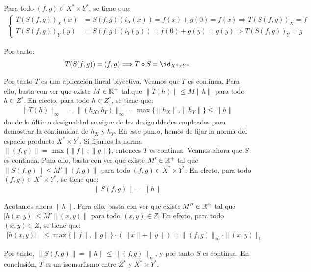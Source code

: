 \begin{ejercicio}
Para todo $(f, g) \in X^* \times Y^*$, se tiene que:
\begin{align*}
    \begin{cases}
        T(S(f, g))_X(x) &= S(f, g)(i_X(x)) = f(x) + g(0) = f(x) \Longrightarrow T(S(f, g))_X = f\\
        T(S(f, g))_Y(y) &= S(f, g)(i_Y(y)) = f(0) + g(y) = g(y) \Longrightarrow T(S(f, g))_Y = g
    \end{cases}
\end{align*}

Por tanto:
$$T(S(f, g)) = (f, g) \Longrightarrow T \circ S = \id_{X^* \times Y^*}$$

Por tanto $T$ es una aplicación lineal biyectiva. Veamos que $T$ es continua. Para ello, basta con ver que existe $M \in \mathbb{R}^+$ tal que $\|T(h)\| \leq M \|h\|$ para todo $h \in Z^*$. En efecto, para todo $h \in Z^*$, se tiene que:
\begin{align*}
    \|T(h)\|_\infty &= \|(h_X, h_Y)\|_\infty = \max\{\|h_X\|, \|h_Y\|\} \leq \|h\|
\end{align*}
donde la última desigualdad se sigue de las desigualdades empleadas para demostrar la continuidad de $h_X$ y $h_Y$. En este punto, hemos de fijar la norma del espacio producto $X^* \times Y^*$. Si fijamos la norma $\|(f, g)\| = \max\{\|f\|, \|g\|\}$, entonces $T$ es continua. Veamos ahora que $S$ es continua. Para ello, basta con ver que existe $M' \in \mathbb{R}^+$ tal que $\|S(f, g)\| \leq M' \|(f, g)\|$ para todo $(f, g) \in X^* \times Y^*$. En efecto, para todo $(f, g) \in X^* \times Y^*$, se tiene que:
\begin{align*}
    \|S(f, g)\| = \|h\|
\end{align*}

Acotamos ahora $\|h\|$. Para ello, basta con ver que existe $M'' \in \mathbb{R}^+$ tal que $|h(x, y)| \leq M' \|(x, y)\|$ para todo $(x, y) \in Z$. En efecto, para todo $(x, y) \in Z$, se tiene que:
\begin{align*}
    |h(x, y)| &\leq \max\{\|f\|, \|g\|\} \cdot (\|x\| + \|y\|) = \|(f, g)\|_\infty \cdot \|(x, y)\|_1
\end{align*}

Por tanto, $\|S(f, g)\| = \|h\| \leq \|(f, g)\|_\infty$, y por tanto $S$ es continua. En conclusión, $T$ es un isomorfismo entre $Z^*$ y $X^* \times Y^*$.
\end{ejercicio}

